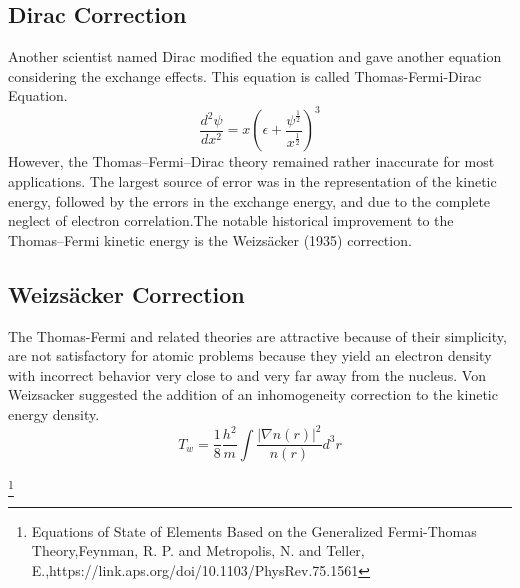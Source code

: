\subsection{Dirac Correction}
Another scientist named Dirac modified the equation and gave another equation considering the exchange effects. This equation is called Thomas-Fermi-Dirac Equation.
\newline
\newline
\begin{equation}
\frac{d^2 \psi}{dx^2}=x(\epsilon+\frac{\psi^\frac{1}{2}}{x^\frac{1}{2}}  )^3
\end{equation}
\newline
However, the Thomas–Fermi–Dirac theory remained rather inaccurate for most applications. The largest source of error was in the representation of the kinetic energy, followed by the errors in the exchange energy, and due to the complete neglect of electron correlation.The notable historical improvement to the Thomas–Fermi kinetic energy is the Weizsäcker (1935) correction.
\subsection{Weizsäcker Correction}
The Thomas-Fermi and related theories are attractive because of their simplicity, are not satisfactory for atomic problems because they yield an electron density with incorrect behavior very close to and very far away from the nucleus. Von Weizsacker suggested the addition of an inhomogeneity correction to the kinetic energy density.
\begin{equation}
T_w=\frac{1}{8}\frac{h^2}{m}\int \frac{|\nabla n(r)|^2}{n(r)}d^3r
\end{equation}

\footnote{Equations of State of Elements Based on the Generalized Fermi-Thomas Theory,Feynman, R. P. and Metropolis, N. and Teller, E.,https://link.aps.org/doi/10.1103/PhysRev.75.1561}

